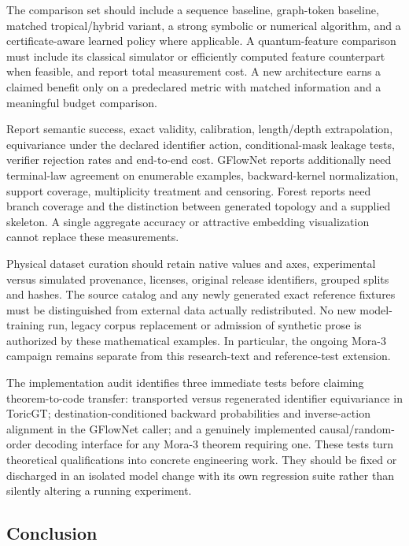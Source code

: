 The comparison set should include a sequence baseline, graph-token baseline, matched tropical/hybrid variant, a strong symbolic or numerical algorithm, and a certificate-aware learned policy where applicable. A quantum-feature comparison must include its classical simulator or efficiently computed feature counterpart when feasible, and report total measurement cost. A new architecture earns a claimed benefit only on a predeclared metric with matched information and a meaningful budget comparison.

Report semantic success, exact validity, calibration, length/depth extrapolation, equivariance under the declared identifier action, conditional-mask leakage tests, verifier rejection rates and end-to-end cost. GFlowNet reports additionally need terminal-law agreement on enumerable examples, backward-kernel normalization, support coverage, multiplicity treatment and censoring. Forest reports need branch coverage and the distinction between generated topology and a supplied skeleton. A single aggregate accuracy or attractive embedding visualization cannot replace these measurements.

Physical dataset curation should retain native values and axes, experimental versus simulated provenance, licenses, original release identifiers, grouped splits and hashes. The source catalog and any newly generated exact reference fixtures must be distinguished from external data actually redistributed. No new model-training run, legacy corpus replacement or admission of synthetic prose is authorized by these mathematical examples. In particular, the ongoing Mora-3 campaign remains separate from this research-text and reference-test extension.

The implementation audit identifies three immediate tests before claiming theorem-to-code transfer: transported versus regenerated identifier equivariance in ToricGT; destination-conditioned backward probabilities and inverse-action alignment in the GFlowNet caller; and a genuinely implemented causal/random-order decoding interface for any Mora-3 theorem requiring one. These tests turn theoretical qualifications into concrete engineering work. They should be fixed or discharged in an isolated model change with its own regression suite rather than silently altering a running experiment.

\subsection{Conclusion}

